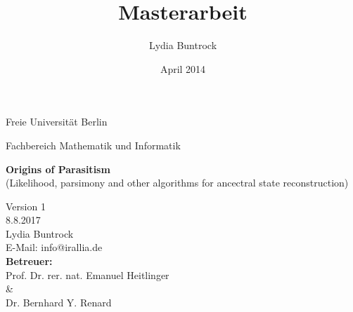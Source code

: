 
\author{Lydia Buntrock}
\title{Masterarbeit}
\date{April 2014}


  \begin{titlepage}
    \pagestyle{empty}
  	\begin{center}
      {\Large Freie Universität Berlin}\\
    	\begin{Huge}
      	Fachbereich Mathematik und Informatik\\
      	\vspace{3mm}
    	\end{Huge}
    	\vspace{20mm}
    	\begin{Large}
    	    \textbf{Origins of Parasitism}\\
          (Likelihood, parsimony and other algorithms for ancectral state reconstruction)\\
    	\end{Large}
    	\vspace{8mm}
      Version 1\\
      8.8.2017\\
    	\vspace{2cm}
    	Lydia Buntrock \\
      E-Mail: info@irallia.de\\
     	\vspace{5cm}
    	\textbf{Betreuer:}\\
      Prof. Dr. rer. nat. Emanuel Heitlinger\\
      \& \\
      Dr. Bernhard Y. Renard\\
  	\end{center}
  	\clearpage
  \end{titlepage}

  \tableofcontents
  \clearpage


